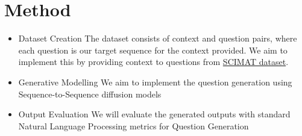 \documentclass[
11pt,notheorems,hyperref={pdfauthor=whatever}
]{beamer}
\begin{document}
\begin{Large}
\begin{frame}
\begin{itemize}
\end{itemize}
\end{frame}

\section{Method}
\begin{frame}
\begin{itemize}
    

    \item Dataset Creation
        \newline
  		The dataset consists of context and question pairs, where each question is our target sequence for the context provided.   
        We aim to implement this by providing context to questions from \href{https://github.com/misterpawan/scimat2}{SCIMAT dataset}.
        
    \newline
    \newline
    
    \item Generative Modelling
        \newline 
        We aim to implement the question generation using Sequence-to-Sequence diffusion models 

    \newline
    \newline
    
    \item Output Evaluation
        \newline
        We will evaluate the generated outputs with standard Natural Language Processing metrics for Question Generation
\end{itemize}
			

\end{frame}
\end{Large}
\end{document}
